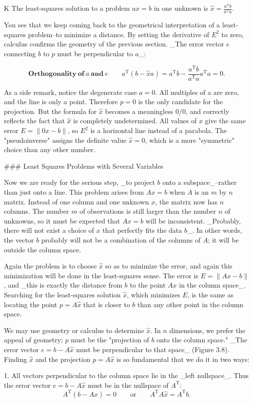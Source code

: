 K The least-squares solution to a problem \(ax=b\) in one unknown is \(\widehat{x}=\frac{a^{\mathrm{T}}b}{a^{\mathrm{T}}a}\).

You see that we keep coming back to the geometrical interpretation of a least-squares problem--to minimize a distance. By setting the derivative of \(E^{2}\) to zero, calculus confirms the geometry of the previous section. _The error vector \(e\) connecting \(b\) to \(p\) must be perpendicular to \(a\)_:

\[\mathbf{Orthogonality\ of\ }a\mathbf{\ and\ }e\qquad a^{\mathrm{T}}(b-\widehat{x}a)=a^{ \mathrm{T}}b-\frac{a^{\mathrm{T}}b}{a^{\mathrm{T}}a}a^{\mathrm{T}}a=0.\]

As a side remark, notice the degenerate case \(a=0\). All multiples of a are zero, and the line is only a point. Therefore \(p=0\) is the only candidate for the projection. But the formula for \(\widehat{x}\) becomes a meaningless \(0/0\), and correctly reflects the fact that \(\widehat{x}\) is completely undetermined. All values of \(x\) give the same error \(E=\|0x-b\|\), so \(E^{2}\) is a horizontal line instead of a parabola. The "pseudoinverse" assigns the definite value \(\widehat{x}=0\), which is a more "symmetric" choice than any other number.

### Least Squares Problems with Several Variables

Now we are ready for the serious step, _to project \(b\) onto a subspace_--rather than just onto a line. This problem arises from \(Ax=b\) when \(A\) is an \(m\) by \(n\) matrix. Instead of one column and one unknown \(x\), the matrix now has \(n\) columns. The number \(m\) of observations is still larger than the number \(n\) of unknowns, so it must be expected that \(Ax=b\) will be inconsistent. _Probably, there will not exist a choice of \(x\) that perfectly fits the data \(b\)_. In other words, the vector \(b\) probably will not be a combination of the columns of \(A\); it will be outside the column space.

Again the problem is to choose \(\widehat{x}\) so as to minimize the error, and again this minimization will be done in the least-squares sense. The error is \(E=\|Ax-b\|\), and _this is exactly the distance from \(b\) to the point \(Ax\) in the column space_. Searching for the least-squares solution \(\widehat{x}\), which minimizes \(E\), is the same as locating the point \(p=A\widehat{x}\) that is closer to \(b\) than any other point in the column space.

We may use geometry or calculus to determine \(\widehat{x}\). In \(n\) dimensions, we prefer the appeal of geometry; \(p\) must be the "projection of \(b\) onto the column space." _The error vector \(e=b-A\widehat{x}\) must be perpendicular to that space_ (Figure 3.8). Finding \(\widehat{x}\) and the projection \(p=A\widehat{x}\) is so fundamental that we do it in two ways:

1. All vectors perpendicular to the column space lie in the _left nullspace_. Thus the error vector \(e=b-A\widehat{x}\) must be in the nullspace of \(A^{\mathrm{T}}\): \[A^{\mathrm{T}}(b-A\widehat{x})=0\qquad\text{or}\qquad A^{\mathrm{T}}A\widehat {x}=A^{\mathrm{T}}b.\] 